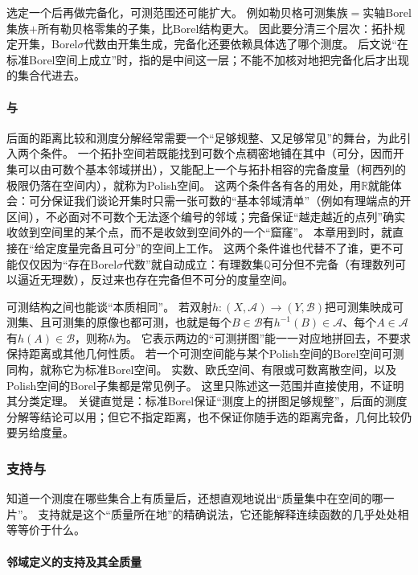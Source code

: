 选定一个后再做完备化，可测范围还可能扩大。
例如勒贝格可测集族$=$实轴Borel集族$+$所有勒贝格零集的子集，比Borel结构更大。
因此要分清三个层次：拓扑规定开集，Borel$\sigma$代数由开集生成，完备化还要依赖具体选了哪个测度。
后文说“在标准Borel空间上成立”时，指的是中间这一层；不能不加核对地把完备化后才出现的集合代进去。

\paragraph{与}

后面的距离比较和测度分解经常需要一个“足够规整、又足够常见”的舞台，为此引入两个条件。
一个拓扑空间若既能找到可数个点稠密地铺在其中（可分，因而开集可以由可数个基本邻域拼出），又能配上一个与拓扑相容的完备度量（柯西列的极限仍落在空间内），就称为Polish空间。
这两个条件各有各的用处，用$\mathbb R$就能体会：可分保证我们谈论开集时只需一张可数的“基本邻域清单”（例如有理端点的开区间），不必面对不可数个无法逐个编号的邻域；完备保证“越走越近的点列”确实收敛到空间里的某个点，而不是收敛到空间外的一个“窟窿”。
本章用到时，就直接在“给定度量完备且可分”的空间上工作。
这两个条件谁也代替不了谁，更不可能仅仅因为“存在Borel$\sigma$代数”就自动成立：有理数集$\mathbb Q$可分但不完备（有理数列可以逼近无理数），反过来也存在完备但不可分的度量空间。

可测结构之间也能谈“本质相同”。
若双射$h:(X,\mathcal A)\to(Y,\mathcal B)$把可测集映成可测集、且可测集的原像也都可测，也就是每个$B\in\mathcal B$有$h^{-1}(B)\in\mathcal A$、每个$A\in\mathcal A$有$h(A)\in\mathcal B$，则称$h$为。
它表示两边的“可测拼图”能一一对应地拼回去，不要求保持距离或其他几何性质。
若一个可测空间能与某个Polish空间的Borel空间可测同构，就称它为标准Borel空间。
实数、欧氏空间、有限或可数离散空间，以及Polish空间的Borel子集都是常见例子。
这里只陈述这一范围并直接使用，不证明其分类定理。
关键直觉是：标准Borel保证“测度上的拼图足够规整”，后面的测度分解等结论可以用；但它不指定距离，也不保证你随手选的距离完备，几何比较仍要另给度量。

\subsubsection{支持与}

知道一个测度在哪些集合上有质量后，还想直观地说出“质量集中在空间的哪一片”。
支持就是这个“质量所在地”的精确说法，它还能解释连续函数的几乎处处相等等价于什么。

\paragraph{邻域定义的支持及其全质量}

